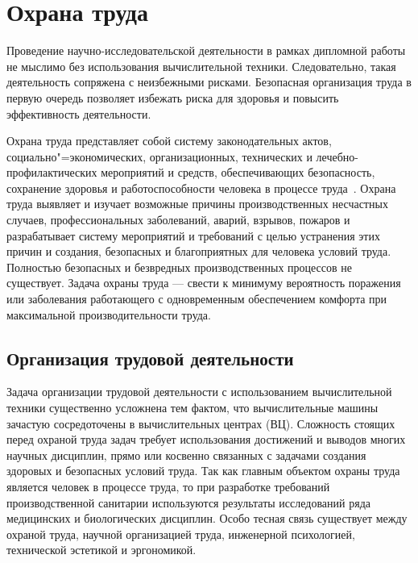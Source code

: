 \section{Охрана труда}
\label{sec:bgd}
 Проведение научно-исследовательской деятельности в рамках дипломной работы не мыслимо без использования вычислительной техники. Следовательно, такая деятельность сопряжена с неизбежными рисками. Безопасная организация труда в первую очередь позволяет избежать риска для здоровья и повысить эффективность деятельности.\par{}

Охрана труда представляет собой систему законодательных актов, социально"=экономических, организационных, технических и лечебно-профилактических мероприятий и средств, обеспечивающих безопасность, сохранение здоровья и работоспособности человека в процессе труда~\cite{BGDEvd1993}. Охрана труда выявляет и изучает возможные причины производственных несчастных случаев, профессиональных заболеваний, аварий, взрывов, пожаров и разрабатывает систему мероприятий и требований с целью устранения этих причин и создания, безопасных и благоприятных для человека условий труда. Полностью безопасных и безвредных производственных процессов не существует. Задача охраны труда --- свести к минимуму вероятность поражения или заболевания работающего с одновременным обеспечением комфорта при максимальной производительности труда.

\subsection{Организация трудовой деятельности}
\label{sec:bgd:trud}
Задача организации трудовой деятельности с использованием вычислительной техники существенно усложнена тем фактом, что вычислительные машины зачастую сосредоточены в вычислительных центрах (ВЦ). Сложность стоящих перед охраной труда задач требует использования достижений и выводов многих научных дисциплин, прямо или косвенно связанных с задачами создания здоровых и безопасных условий труда. Так как главным объектом охраны труда является человек в процессе труда, то при разработке требований производственной санитарии используются результаты исследований ряда медицинских и биологических дисциплин. Особо тесная связь существует между охраной труда, научной организацией труда, инженерной психологией, технической эстетикой и эргономикой.

